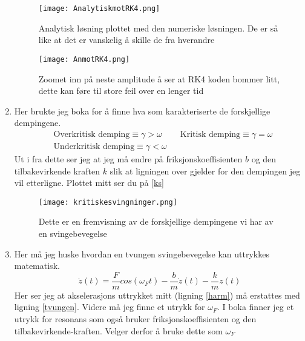 \documentclass[a4paper,12pt,norsk]{article}
\begin{document}
\begin{enumerate}[label=(\alph*)]
\begin{figure}
	\begin{minipage}[b]{0.5\linewidth}
		\texttt{[image: AnalytiskmotRK4.png]} 
		\caption[Analytisk vs Numerisk]{Analytisk løsning plottet med den numeriske løsningen. 
		De er så like at det er vanskelig å skille de fra hverandre}
		\label{ARK4}
	\end{minipage}
	\hspace{0.5cm}
	\begin{minipage}[b]{0.5\linewidth}
		\texttt{[image: AnmotRK4.png]} 
		\caption[Zoom av neste bølgetopp]{Zoomet inn på neste amplitude å ser at RK4 koden 
		bommer litt, dette kan føre til store feil over en lenger tid}
		\label{zARK4}
	\end{minipage}
\end{figure}

\item
Her brukte jeg boka \cite{vistnes16} for å finne hva som karakteriserte de forskjellige dempingene. 
\begin{align*}
&\text{Overkritisk demping} \equiv \gamma > \omega &&\text{Kritisk demping} \equiv \gamma = \omega \\ 
&\text{Underkritisk demping} \equiv \gamma < \omega
\end{align*}
Ut i fra dette ser jeg at jeg må endre på friksjonskoeffisienten $b$ og den tilbakevirkende kraften $k$ slik at ligningen over gjelder for den dempingen jeg vil etterligne. Plottet mitt ser du på \vref{ks}

\begin{figure}[h!]
\texttt{[image: kritiskesvingninger.png]} 
\caption[Demping av svingebevegelse]{Dette er en fremvisning av de forskjellige dempingene vi har av en svingebevegelse}
\label{ks}
\end{figure}

\item
Her må jeg huske hvordan en tvungen svingebevegelse kan uttrykkes matematisk.
\begin{equation}
\ddot{z}(t) = \frac{F}{m}cos(\omega_Ft) - \frac{b}{m}\dot{z}(t) - \frac{k}{m}z(t)
\label{tvungen}
\end{equation}
Her ser jeg at akselerasjons uttrykket mitt (ligning \ref{harm}) må erstattes med ligning \ref{tvungen}. Videre må jeg finne et utrykk for $\omega_F$. I boka \cite{vistnes16} finner jeg et utrykk for resonans som også bruker friksjonskoeffisienten og den tilbakevirkende-kraften. Velger derfor å bruke dette som $\omega_F$


\end{enumerate}
\end{document}
